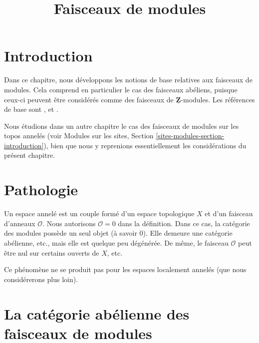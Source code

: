 

%


\title{Faisceaux de modules}


\maketitle

\label{section-phantom}

\tableofcontents

\section{Introduction}
\label{section-introduction}

\noindent
Dans ce chapitre, nous développons les notions de base relatives aux faisceaux
de modules. Cela comprend en particulier le cas des faisceaux abéliens, puisque
ceux-ci peuvent être considérés comme des faisceaux de
$\underline{\mathbf{Z}}$-modules. Les références de base sont
\cite{FAC}, \cite{EGA} et \cite{SGA4}.

\medskip\noindent
Nous étudions dans un autre chapitre le cas des faisceaux de modules sur les
topos annelés (voir Modules sur les sites, Section
\ref{sites-modules-section-introduction}), bien que nous y reprenions
essentiellement les considérations du présent chapitre.





\section{Pathologie}
\label{section-pathology}

\noindent
Un espace annelé est un couple formé d'un espace topologique $X$ et d'un
faisceau d'anneaux $\mathcal{O}$. Nous autorisons $\mathcal{O} = 0$ dans
la définition. Dans ce cas, la catégorie des modules possède un seul objet
(à savoir $0$). Elle demeure une catégorie abélienne, etc., mais elle est
quelque peu dégénérée. De même, le faisceau $\mathcal{O}$ peut être nul
sur certains ouverts de $X$, etc.

\medskip\noindent
Ce phénomène ne se produit pas pour les espaces localement annelés (que nous
considérerons plus loin).








\section{La catégorie abélienne des faisceaux de modules}
\label{section-kernels}

